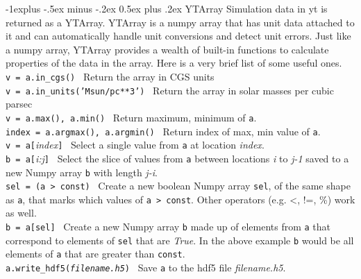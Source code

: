 \documentclass[10pt,landscape]{article}
\makeatletter
\renewcommand{\subsection}{\@startsection{subsection}{2}{0mm}%
                                {-1explus -.5ex minus -.2ex}%
                                {0.5ex plus .2ex}%
                                {\normalfont\normalsize\bfseries}}
\makeatother
\begin{document}
\begin{multicols}{3}
\subsection{YTArray}
Simulation data in yt is returned as a YTArray.  YTArray is a numpy array that
has unit data attached to it and can automatically handle unit conversions and
detect unit errors. Just like a numpy array, YTArray provides a wealth of
built-in functions to calculate properties of the data in the array. Here is a
very brief list of some useful ones.
\\
\texttt{v = a.in\_cgs()} \textemdash\ Return the array in CGS units \\
\texttt{v = a.in\_units('Msun/pc**3')} \textemdash\ Return the array in solar masses per cubic parsec \\
\texttt{v = a.max(), a.min()} \textemdash\ Return maximum, minimum of \texttt{a}. \\
\texttt{index = a.argmax(), a.argmin()} \textemdash\ Return index of max,
min value of \texttt{a}.\\
\texttt{v = a[}\textit{index}\texttt{]} \textemdash\ Select a single value from \texttt{a} at location \textit{index}.\\
\texttt{b = a[}\textit{i:j}\texttt{]} \textemdash\ Select the slice of values from
\texttt{a} between
locations \textit{i} to \textit{j-1} saved to a new Numpy array \texttt{b} with length \textit{j-i}. \\
\texttt{sel = (a > const)} \textemdash\ Create a new boolean Numpy array
\texttt{sel}, of the same shape as \texttt{a},
that marks which values of \texttt{a > const}. Other operators (e.g. \textless, !=, \%) work as well.\\
\texttt{b = a[sel]} \textemdash\ Create a new Numpy array \texttt{b} made up of
elements from \texttt{a} that correspond to elements of \texttt{sel}
that are \textit{True}. In the above example \texttt{b} would be all elements of \texttt{a} that are greater than \texttt{const}.\\
\texttt{a.write\_hdf5(\textit{filename.h5})} \textemdash\ Save \texttt{a} to the hdf5 file \textit{filename.h5}.\\


\end{multicols}
\end{document}
